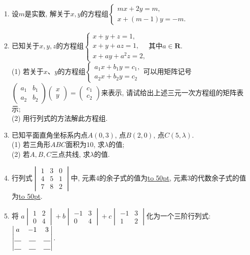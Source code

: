 \documentclass[10pt,a4paper]{article}
\newcommand{\blank}[1]{\underline{\hbox to #1pt{}}}
\begin{document}
\begin{enumerate}[1.]
\item 设$m$是实数, 解关于$x,y$的方程组$\begin{cases} mx+2y=m, \\ x+(m-1)y=-m. \end{cases}$
\item 已知关于$x,y,z$的方程组$\begin{cases} x+y+z=1, \\ x+y+az=1, \\ x+ay+a^2z=2, \end{cases}$其中$a\in \mathbf{R}$.\\
(1) 若关于$x$、$y$的方程组$\begin{cases} a_1x+b_1y=c_1, \\ a_2x+b_2y=c_2 \end{cases}$可以用矩阵记号$\begin{pmatrix}
 a_1 & b_1 \\ a_2 & b_2  \end{pmatrix}\begin{pmatrix}    x  \\ y  \end{pmatrix}=\begin{pmatrix} c_1 \\ c_2 \end{pmatrix}$来表示, 请试给出上述三元一次方程组的矩阵表示;\\
(2) 用行列式的方法解此方程组.
\item 已知平面直角坐标系内点$A(0,3)$, 点$B(2,0)$, 点$C(5,\lambda)$.\\
(1)	若三角形$ABC$面积为$10$, 求$\lambda$的值;\\
(2)	若$A,B,C$三点共线, 求$\lambda$的值.
\item 行列式$\begin{vmatrix} 1 & 3 & 0  \\ 4 & 5 & 1  \\ 7 & 8 & 2 \end{vmatrix}$中, 元素$4$的余子式的值为\blank{50}, 元素$3$的代数余子式的值为\blank{50}.
\item 将 $a\begin{vmatrix} 1 & 2 \\0 & 4 \end{vmatrix}+b \begin{vmatrix}
-1 & 3  \\ 0 & 4 \end{vmatrix}+c \begin{vmatrix}
-1 & 3  \\ 1 & 2 \end{vmatrix}$化为一个三阶行列式: $\begin{vmatrix}a & -1 & 3 \\ \blank{10} & \blank{10} & \blank{10} \\ \blank{10} & \blank{10} & \blank{10}\end{vmatrix}$.

\end{enumerate}
\end{document}
